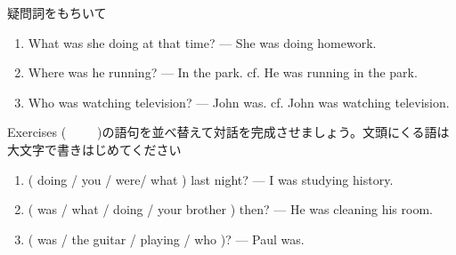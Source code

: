 \documentclass[aspectratio=169,xcolor={dvipsnames,table}]{beamer}
\begin{document}
\begin{frame}[plain]{疑問詞をもちいて}
 \begin{enumerate}
  \item What was she doing at that time? --- She was doing homework.
  \item Where was he running? --- In the park.
	\mbox{}\hfill{}cf. He was running in the park.
  \item Who was watching television? --- John was.
	\mbox{}\hfill{}cf. John was watching television.
 \end{enumerate}

\hfill{}
\end{frame}
\begin{frame}[plain]{Exercises}
(~~~~~)の語句を並べ替えて対話を完成させましょう。文頭にくる語は大文字で書きはじめてください
\begin{enumerate}
 \item ( doing / you / were/ what ) last night?
--- I was studying history. \\
 \item ( was / what / doing / your brother ) then?
--- He was cleaning his room.\\
 \item ( was / the guitar / playing / who )? --- Paul was.\\
\end{enumerate}
\hfill{}


\end{frame}
\end{document}
